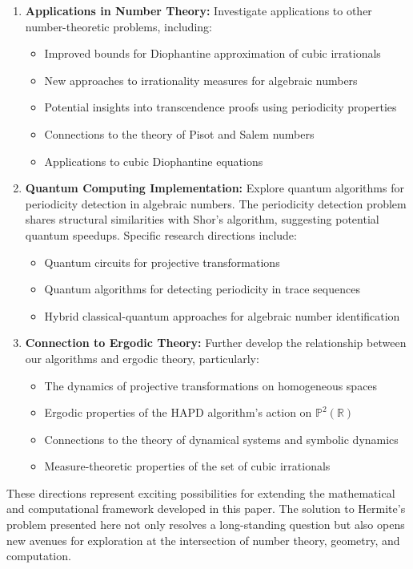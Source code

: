 \begin{enumerate}
\item \textbf{Applications in Number Theory:} Investigate applications to other number-theoretic problems, including:
\begin{itemize}
\item Improved bounds for Diophantine approximation of cubic irrationals
\item New approaches to irrationality measures for algebraic numbers
\item Potential insights into transcendence proofs using periodicity properties
\item Connections to the theory of Pisot and Salem numbers
\item Applications to cubic Diophantine equations
\end{itemize}

\item \textbf{Quantum Computing Implementation:} Explore quantum algorithms for periodicity detection in algebraic numbers. The periodicity detection problem shares structural similarities with Shor's algorithm, suggesting potential quantum speedups. Specific research directions include:
\begin{itemize}
\item Quantum circuits for projective transformations
\item Quantum algorithms for detecting periodicity in trace sequences
\item Hybrid classical-quantum approaches for algebraic number identification
\end{itemize}

\item \textbf{Connection to Ergodic Theory:} Further develop the relationship between our algorithms and ergodic theory, particularly:
\begin{itemize}
\item The dynamics of projective transformations on homogeneous spaces
\item Ergodic properties of the HAPD algorithm's action on $\mathbb{P}^2(\mathbb{R})$
\item Connections to the theory of dynamical systems and symbolic dynamics
\item Measure-theoretic properties of the set of cubic irrationals
\end{itemize}
\end{enumerate}

These directions represent exciting possibilities for extending the mathematical and computational framework developed in this paper. The solution to Hermite's problem presented here not only resolves a long-standing question but also opens new avenues for exploration at the intersection of number theory, geometry, and computation.

